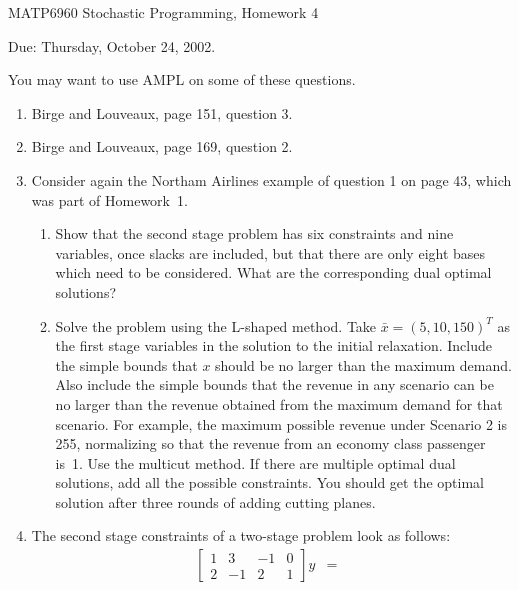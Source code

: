 \documentclass[12pt]{article}
\begin{document}
\begin{center}
  \begin{large}
     MATP6960 Stochastic Programming, Homework 4
  \end{large}
\end{center}

\begin{flushright}
   Due:  Thursday, October 24, 2002.
\end{flushright}

\vspace{\baselineskip}

You may want to use AMPL on some of these questions.

\begin{enumerate}
\item Birge and Louveaux, page 151, question 3.
\item Birge and Louveaux, page 169, question 2.
\item Consider again the Northam Airlines example of question 1 on page 43,
which was part of Homework~1.
\begin{enumerate}
\item Show that the second stage problem has six constraints and nine variables,
once slacks are
included, but that there are only eight bases which need to be considered.
What are the corresponding dual optimal solutions?
\item Solve the problem using the L-shaped method. Take $\bar{x}=(5,10,150)^T$
as the first stage variables in the solution to the initial relaxation.
Include the simple bounds that $x$ should be no larger than the maximum
demand.
Also include the simple bounds
that the revenue in any scenario can be no larger than the revenue
obtained from the maximum demand for that scenario.
For example, the maximum possible revenue under Scenario 2 is 255,
normalizing so that the revenue from an economy class passenger is~1.
Use the multicut method.
If there are multiple optimal dual solutions, add all the possible
constraints.
You should get the optimal solution after three rounds of adding cutting
planes.
\end{enumerate}
\item The second stage constraints of a two-stage problem look as follows:
\begin{displaymath}
\begin{array}{rcl}
\left[ \begin{array}{rrrr}1&3&-1&0\\2&-1&2&1\end{array}\right] y &=&

\end{array}
\end{displaymath}
\end{enumerate}
\end{document}
